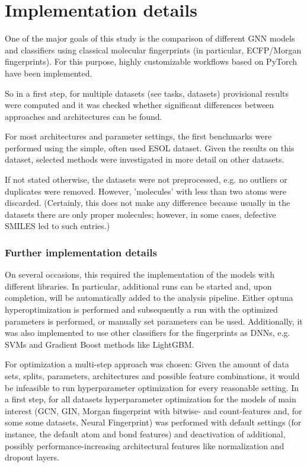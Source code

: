 \chapter{Implementation details}

One of the major goals of this study is the comparison of different GNN models and classifiers using classical molecular fingerprints (in particular, ECFP/Morgan fingerprints).
For this purpose, highly customizable workflows based on PyTorch have been implemented.




So in a first step, for multiple datasets (see tasks, datasets) provisional results were computed and it was checked whether significant differences between approaches and architectures can be found.

For most architectures and parameter settings, the first benchmarks were performed using the simple, often used ESOL dataset. Given the results on this dataset, selected methods were investigated in more detail on other datasets.

If not stated otherwise, the datasets were not preprocessed, e.g. no outliers or duplicates were removed. However, 'molecules' with less than two atoms were discarded. (Certainly, this does not make any difference because usually in the datasets there are only proper molecules; however, in some cases, defective SMILES led to such entries.) 






\subsection{Further implementation details}

On several occasions, this required the implementation of the models with different libraries.
In particular, additional runs can be started and, upon completion, will be automatically added to the analysis pipeline.
Either optuna hyperoptimization is performed and subsequently a run with the optimized parameters is performed, or manually set parameters can be used.
Additionally, it was also implemented to use other classifiers for the fingerprints as DNNs, e.g. SVMs and Gradient Boost methods like LightGBM.

For optimization a multi-step approach was chosen: Given the amount of data sets, splits, parameters, architectures and possible feature combinations, it would be infeasible to run hyperparameter optimization for every reasonable setting.
In a first step, for all datasets hyperparameter optimization for the models of main interest (GCN, GIN, Morgan fingerprint with bitwise- and count-features and, for some some datasets, Neural Fingerprint) was performed with default settings (for instance, the default atom and bond features) and deactivation of additional, possibly performance-increasing architectural features like normalization and dropout layers.

